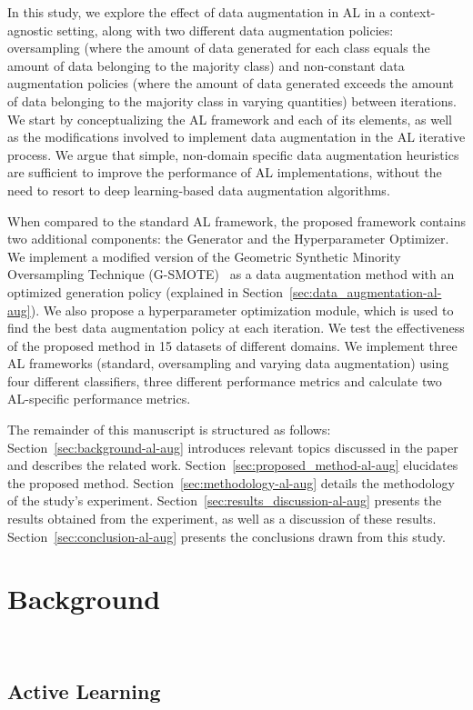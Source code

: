 In this study, we explore the effect of data augmentation in AL in a
context-agnostic setting, along with two different data augmentation policies:
oversampling (where the amount of data generated for each class equals
the amount of data belonging to the majority class) and non-constant data
augmentation policies (where the amount of data generated exceeds the amount
of data belonging to the majority class in varying quantities) between
iterations. We start by conceptualizing the AL framework and each of its
elements, as well as the modifications involved to implement data augmentation
in the AL iterative process. We argue that simple, non-domain specific data
augmentation heuristics are sufficient to improve the performance of AL
implementations, without the need to resort to deep learning-based data
augmentation algorithms.

When compared to the standard AL framework, the proposed framework contains
two additional components: the Generator and the Hyperparameter Optimizer. We
implement a modified version of the Geometric Synthetic Minority Oversampling
Technique (G-SMOTE)~\cite{Douzas2019} as a data augmentation method with an
optimized generation policy (explained in
Section~\ref{sec:data_augmentation-al-aug}). We also propose a hyperparameter
optimization module, which is used to find the best data
augmentation policy at each iteration. We test the effectiveness of the
proposed method in 15 datasets of different domains. We implement
three AL frameworks (standard, oversampling and varying data
augmentation) using four different classifiers, three different
performance metrics and calculate two AL-specific performance metrics. 

The remainder of this manuscript is structured as follows:
Section~\ref{sec:background-al-aug} introduces relevant topics discussed in
the paper and describes the related work. Section~\ref{sec:proposed_method-al-aug}
elucidates the proposed method. Section~\ref{sec:methodology-al-aug}
details the methodology of the study's experiment.
Section~\ref{sec:results_discussion-al-aug} presents the results obtained from the
experiment, as well as a discussion of these results.
Section~\ref{sec:conclusion-al-aug} presents the conclusions drawn from this study.
 
\section{Background}~\label{sec:background-al-aug}

\subsection{Active Learning}~\label{sec:active_learning_methods-al-aug}

